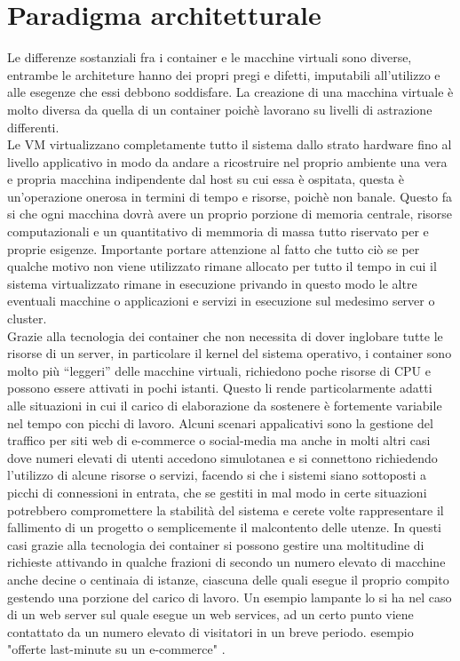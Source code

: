 \documentclass[a4paper,12pt,openright,twoside]{report}
\begin{document}
\section{Paradigma architetturale}
Le differenze sostanziali fra i container e le macchine virtuali sono diverse, entrambe le architeture hanno dei propri pregi e difetti, imputabili all'utilizzo e alle esegenze che essi debbono soddisfare. La creazione di una macchina virtuale è molto diversa da quella di un container poichè lavorano su livelli di astrazione differenti.\\Le VM virtualizzano completamente tutto il sistema dallo strato hardware fino al livello applicativo in modo da andare a ricostruire nel proprio ambiente una vera e propria macchina indipendente dal host su cui essa è ospitata, questa è un'operazione onerosa in termini di tempo e risorse, poichè non banale. Questo fa si che ogni macchina dovrà avere un proprio porzione di memoria centrale, risorse computazionali e un quantitativo di memmoria di massa tutto riservato per e proprie esigenze. Importante portare attenzione al fatto che tutto ciò se per qualche motivo non viene utilizzato rimane allocato per tutto il tempo in cui il sistema virtualizzato rimane in esecuzione privando in questo modo le altre eventuali macchine o applicazioni e servizi in esecuzione sul medesimo server o cluster.\\
Grazie alla tecnologia dei container che non necessita di dover inglobare tutte le risorse di un server, in particolare il kernel del sistema operativo, i container sono molto più “leggeri” delle macchine virtuali, richiedono poche risorse di CPU e possono essere attivati in pochi istanti. Questo li rende particolarmente adatti alle situazioni in cui il carico di elaborazione da sostenere è fortemente variabile nel tempo con picchi di lavoro.
Alcuni scenari appalicativi sono la gestione del traffico per siti web di e-commerce o social-media ma anche in molti altri casi dove numeri elevati di utenti accedono simulotanea e si connettono richiedendo l'utilizzo di alcune risorse o servizi, facendo si che i sistemi siano sottoposti a picchi di connessioni in entrata, che se gestiti in mal modo in certe situazioni potrebbero compromettere la stabilità del sistema e cerete volte rappresentare il fallimento di un progetto o semplicemente il malcontento delle utenze. In questi casi grazie alla tecnologia dei container si possono gestire una moltitudine di richieste attivando in qualche frazioni di secondo un numero elevato di macchine anche decine o centinaia di istanze, ciascuna delle quali esegue il proprio compito gestendo una porzione del carico di lavoro. Un esempio lampante lo si ha nel caso di un web server sul quale esegue un web services, ad un certo punto viene contattato da un numero elevato di visitatori in un breve periodo. esempio "offerte last-minute su un e-commerce" .\\
\end{document}
